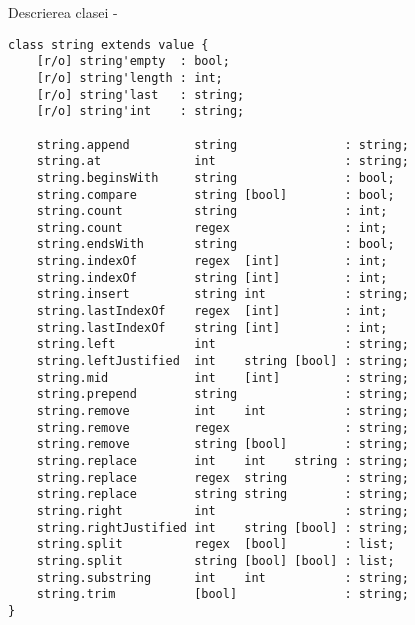 \noindent Descrierea clasei \str -
\begin{verbatim}
class string extends value {
    [r/o] string'empty  : bool;
    [r/o] string'length : int;
    [r/o] string'last   : string;
    [r/o] string'int    : string;

    string.append         string               : string;
    string.at             int                  : string;
    string.beginsWith     string               : bool;
    string.compare        string [bool]        : bool;
    string.count          string               : int;
    string.count          regex                : int;
    string.endsWith       string               : bool;
    string.indexOf        regex  [int]         : int;
    string.indexOf        string [int]         : int;
    string.insert         string int           : string;
    string.lastIndexOf    regex  [int]         : int;
    string.lastIndexOf    string [int]         : int;
    string.left           int                  : string;
    string.leftJustified  int    string [bool] : string;
    string.mid            int    [int]         : string;
    string.prepend        string               : string;
    string.remove         int    int           : string;
    string.remove         regex                : string;
    string.remove         string [bool]        : string;
    string.replace        int    int    string : string;
    string.replace        regex  string        : string;
    string.replace        string string        : string;
    string.right          int                  : string;
    string.rightJustified int    string [bool] : string;
    string.split          regex  [bool]        : list;
    string.split          string [bool] [bool] : list;
    string.substring      int    int           : string;
    string.trim           [bool]               : string;
}
\end{verbatim}


